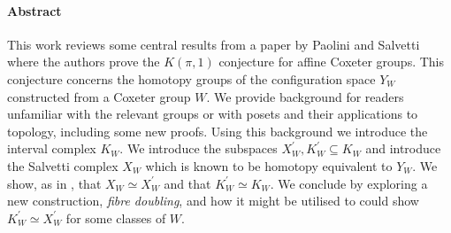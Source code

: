\documentclass[class=guthesis, crop=false]{standalone}
\begin{document}
\paragraph{Abstract}
This work reviews some central results from a paper by Paolini and Salvetti \cite{paolini_salvetti_kpi1_2021} where the authors prove the $K(\pi,1)$ conjecture for affine Coxeter groups. This conjecture concerns the homotopy groups of the configuration space $Y_W$ constructed from a Coxeter group $W$. We provide background for readers unfamiliar with the relevant groups or with posets and their applications to topology, including some new proofs. Using this background we introduce the interval complex $K_W$. We introduce the subspaces $X^\prime_W, K^\prime_W \subseteq K_W$ and introduce the Salvetti complex $X_W$ which is known to be homotopy equivalent to $Y_W$. We show, as in \cite{paolini_salvetti_kpi1_2021}, that $X_W \simeq X^\prime_W$ and that $K^\prime_W \simeq K_W$. We conclude by exploring a new construction, \emph{fibre doubling}, and how it might be utilised to could show $K^\prime_W\simeq X^\prime_W$ for some classes of $W$. 
\end{document}
